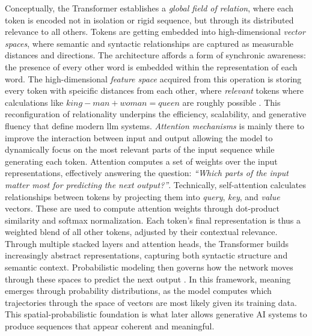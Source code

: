Conceptually, the Transformer establishes a \emph{global field of relation},
where each token is encoded not in isolation or rigid sequence, but through its
distributed relevance to all others. Tokens are getting embedded
into high-dimensional \emph{vector spaces}, where semantic and syntactic
relationships are captured as measurable distances and directions. The architecture affords a form of
synchronic awareness: the presence of every other word is embedded within the
representation of each word. The high-dimensional \textit{feature space} acquired from this
operation is storing every token with speicific distances from each other,
where \textit{relevant} tokens where calculations like \( king-man+woman=queen\) are roughly possible \parencite[]{ai-inquiry2025}. This reconfiguration of relationality underpins the
efficiency, scalability, and generative fluency that define modern \gls{llm}
systems.
\emph{Attention mechanisms} is mainly there to improve the interaction between
input and output allowing the model to
dynamically focus on the most relevant parts of the input sequence while
generating each \gls{token}. Attention computes a set of weights over the input
representations, effectively answering the question:
\emph{“Which parts of the input matter most for predicting the next output?”}.
Technically, self-attention calculates relationships between \glspl{token} by projecting them into \emph{query}, \emph{key}, and \emph{value} vectors. These are used to compute attention weights through dot-product similarity and softmax normalization. Each token's final representation is thus a weighted blend of all other tokens, adjusted by their contextual relevance. Through multiple stacked layers and attention heads, the Transformer builds increasingly abstract representations, capturing both syntactic structure and semantic context. 
Probabilistic modeling then governs how the network moves through these spaces
to predict the next output \parencite[198]{montanari2025}. In this framework,
meaning emerges through probability distributions, as the
model computes which trajectories through the space of vectors are most
likely given its training data. This spatial-probabilistic foundation is what
later allows generative AI systems to produce sequences that appear coherent
and meaningful.

